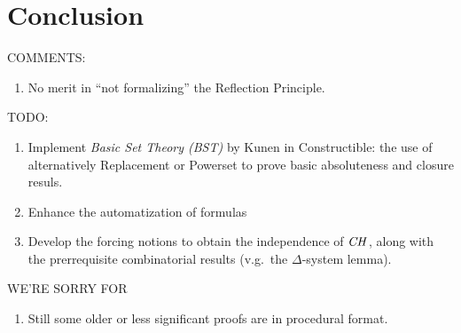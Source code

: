 \section{Conclusion}
\label{sec:conclusion}

COMMENTS:
\begin{enumerate}
\item No merit in ``not formalizing'' the Reflection Principle.
\end{enumerate}

\noindent TODO:
\begin{enumerate}
\item Implement \emph{Basic Set Theory (BST)} by Kunen in
  Constructible: the use of alternatively Replacement or Powerset to
  prove basic absoluteness and closure resuls.
\item Enhance the automatization of formulas
\item Develop the forcing notions to obtain the independence of $\mathit{CH}$,
  along with the prerrequisite combinatorial results (v.g.\ the
  $\Delta$-system lemma).
\end{enumerate}

\noindent WE'RE SORRY FOR
\begin{enumerate}
\item Still some older or less significant proofs are in procedural
  format.
\end{enumerate}

